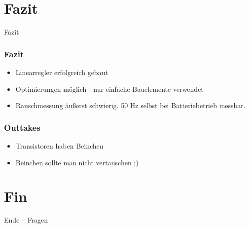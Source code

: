 \documentclass[aspectratio=32]{beamer}
\begin{document}
\section{Fazit}
{
  \logo{}
  \begin{frame}
    \centering
    \Large{Fazit}
  \end{frame}
}

\begin{frame}
  \frametitle{Fazit}
  \centering
  \begin{itemize}
    \item Linearregler erfolgreich gebaut
    \item Optimierungen möglich - nur einfache Bauelemente verwendet
    \item Rauschmessung äußerst schwierig. 
    50 Hz selbst bei Batteriebetrieb messbar. 
  \end{itemize}
\end{frame}

\begin{frame}
  \frametitle{Outtakes}
  \centering
  \begin{itemize}
    \item Transistoren haben Beinchen
    \item Beinchen sollte man nicht vertauschen ;)
  \end{itemize}
\end{frame}

\section{Fin}
{
  \logo{}
  \begin{frame}
    \centering
    \Large{Ende -- Fragen}
  \end{frame}
}
\end{document}
